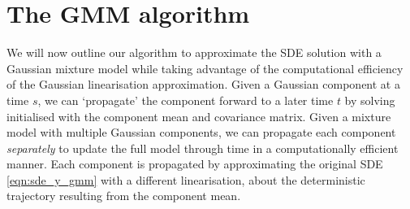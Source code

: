 \section{The GMM algorithm}\label{sec:gmm_alg}
We will now outline our algorithm to approximate the SDE solution with a Gaussian mixture model while taking advantage of the computational efficiency of the Gaussian linearisation approximation.
Given a Gaussian component at a time \(s\), we can `propagate' the component forward to a later time \(t\) by solving  initialised with the component mean and covariance matrix.
Given a mixture model with multiple Gaussian components, we can propagate each component \emph{separately} to update the full model through time in a computationally efficient manner.
Each component is propagated by approximating the original SDE \cref{eqn:sde_y_gmm} with a different linearisation, about the deterministic trajectory resulting from the component mean.

